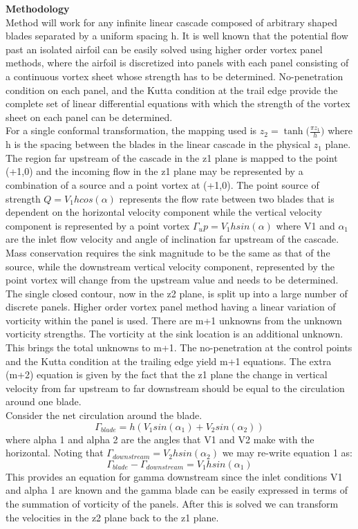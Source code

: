 \documentclass{article}
\begin{document}
\noindent \textbf{Methodology}\\
Method will work for any infinite linear cascade composed of arbitrary shaped blades separated by a uniform spacing h. It is well known that the potential flow past an isolated airfoil can be easily solved using higher order vortex panel methods, where the airfoil is discretized into panels with each panel consisting of a continuous vortex sheet whose strength has to be determined. No-penetration condition on each panel, and the Kutta condition at the trail edge provide the complete set of linear differential equations with which the strength of the vortex sheet on each panel can be determined. \\
For a single conformal transformation, the mapping used is $z_2 = \tanh \Big( \frac{\pi z_1}{h}\Big) $ where h is the spacing between the blades in the linear cascade in the physical $z_1$ plane. The region far upstream of the cascade in the z1 plane is mapped to the point (+1,0) and the incoming flow in the z1 plane may be represented by a combination of a source and a point vortex at (+1,0). The point source of strength $Q = V_1 h cos(\alpha)$ represents the flow rate between two blades that is dependent on the horizontal velocity component while the vertical velocity component is represented by a point vortex $\Gamma_up = V_1 h sin(\alpha) $ where V1 and $\alpha_1$ are the inlet flow velocity and angle of inclination far upstream of the cascade. Mass conservation requires the sink magnitude to be the same as that of the source, while the downstream vertical velocity component, represented by the point vortex will change from the upstream value and needs to be determined.\\
The single closed contour, now in the z2 plane, is split up into a large number of discrete panels. Higher order vortex panel method having a linear variation of vorticity within the panel is used. There are m+1 unknowns from the unknown vorticity strengths. The vorticity at the sink location is an additional unknown. This brings the total unknowns to m+1. The no-penetration at the control points and the Kutta condition at the trailing edge yield m+1 equations. The extra (m+2) equation is given by the fact that the z1 plane the change in vertical velocity from far upstream to far downstream should be equal to the circulation around one blade. \\
Consider the net circulation around the blade. \\
\begin{equation}
\Gamma_{blade} = h(V_{1} sin(\alpha_1) + V_{2} sin(\alpha_2))
\end{equation}
where alpha 1 and alpha 2 are the angles that V1 and V2 make with the horizontal. Noting that $\Gamma_{downstream} = V_2 h sin(\alpha_2)$ we may re-write equation 1 as:
\begin{equation}
\Gamma_{blade} - \Gamma_{downstream} = V_{1} h sin(\alpha_1)
\end{equation}
This provides an equation for gamma downstream since the inlet conditions V1 and alpha 1 are known and the gamma blade can be easily expressed in terms of the summation of vorticity of the panels. After this is solved we can transform the velocities in the z2 plane back to the z1 plane.
\end{document}
